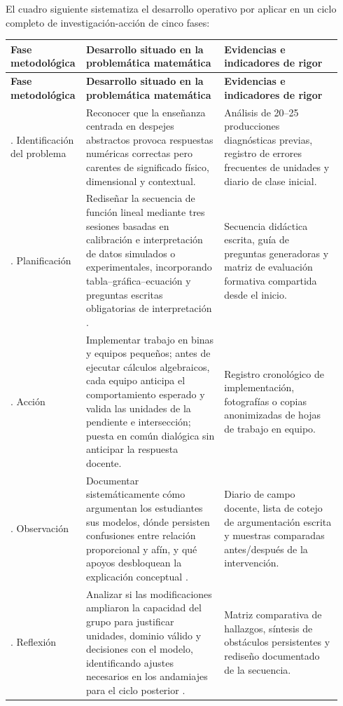 \documentclass[spanish,letterpaper,oneside]{article}
\begin{document}
El cuadro siguiente sistematiza el desarrollo operativo por aplicar en un ciclo completo de investigación-acción de cinco fases:

{\small{}\renewcommand{\arraystretch}{1.35}
\begin{longtable}{|>{\raggedright\arraybackslash}p{0.18\linewidth}|>{\raggedright\arraybackslash}p{0.41\linewidth}|>{\raggedright\arraybackslash}p{0.35\linewidth}|}\hline
\rowcolor{iiiepePale} \textbf{Fase metodológica} & \textbf{Desarrollo situado en la problemática matemática} & \textbf{Evidencias e indicadores de rigor} \\\hline
\endfirsthead
\hline
\rowcolor{iiiepePale} \textbf{Fase metodológica} & \textbf{Desarrollo situado en la problemática matemática} & \textbf{Evidencias e indicadores de rigor} \\\hline
\endhead
1. Identificación del problema & Reconocer que la enseñanza centrada en despejes abstractos provoca respuestas numéricas correctas pero carentes de significado físico, dimensional y contextual. & Análisis de 20--25 producciones diagnósticas previas, registro de errores frecuentes de unidades y diario de clase inicial. \\\hline
2. Planificación & Rediseñar la secuencia de función lineal mediante tres sesiones basadas en calibración e interpretación de datos simulados o experimentales, incorporando tabla--gráfica--ecuación y preguntas escritas obligatorias de interpretación \citep{sawyer2008optimizing}. & Secuencia didáctica escrita, guía de preguntas generadoras y matriz de evaluación formativa compartida desde el inicio. \\\hline
3. Acción & Implementar trabajo en binas y equipos pequeños; antes de ejecutar cálculos algebraicos, cada equipo anticipa el comportamiento esperado y valida las unidades de la pendiente e intersección; puesta en común dialógica sin anticipar la respuesta docente. & Registro cronológico de implementación, fotografías o copias anonimizadas de hojas de trabajo en equipo. \\\hline
4. Observación & Documentar sistemáticamente cómo argumentan los estudiantes sus modelos, dónde persisten confusiones entre relación proporcional y afín, y qué apoyos desbloquean la explicación conceptual \citep{eef2021feedback}. & Diario de campo docente, lista de cotejo de argumentación escrita y muestras comparadas antes/después de la intervención. \\\hline
5. Reflexión & Analizar si las modificaciones ampliaron la capacidad del grupo para justificar unidades, dominio válido y decisiones con el modelo, identificando ajustes necesarios en los andamiajes para el ciclo posterior \citep{restrepo2004investigacion}. & Matriz comparativa de hallazgos, síntesis de obstáculos persistentes y rediseño documentado de la secuencia. \\\hline
\end{longtable}}
\end{document}
